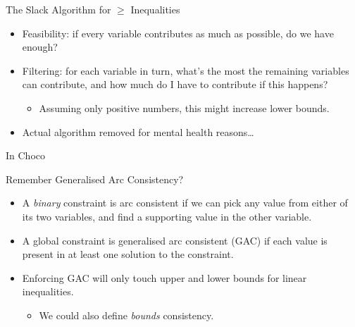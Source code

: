 \documentclass{beamer}
\begin{document}
\begin{frame}{The Slack Algorithm for $\ge$ Inequalities}
    \begin{itemize}
        \item Feasibility: if every variable contributes as much as possible,
            do we have enough?
        \item Filtering: for each variable in turn, what's the most the
            remaining variables can contribute, and how much do I have to
            contribute if this happens?
            \begin{itemize}
                \item Assuming only positive numbers, this might increase lower bounds.
            \end{itemize}
        \item Actual algorithm removed for mental health reasons\ldots
    \end{itemize}
\end{frame}

\begin{frame}[fragile]{In Choco}
     {
        
    }
     {
        \begin{minipage}{0.47\paperwidth}
        \end{minipage}\begin{minipage}{0.44\paperwidth}
        \end{minipage}
    }
\end{frame}

\begin{frame}{Remember Generalised Arc Consistency?}
    \begin{itemize}
        \item A \emph{binary} constraint is arc consistent if we can pick any value from either of its
            two variables, and find a supporting value in the other variable.
        \item A global constraint is generalised arc consistent (GAC) if each value
            is present in at least one solution to the constraint.
        \item Enforcing GAC will only touch upper and lower bounds for
            linear inequalities.
            \begin{itemize}
                \item We could also define \emph{bounds} consistency.
            \end{itemize}
    \end{itemize}
\end{frame}
\end{document}

